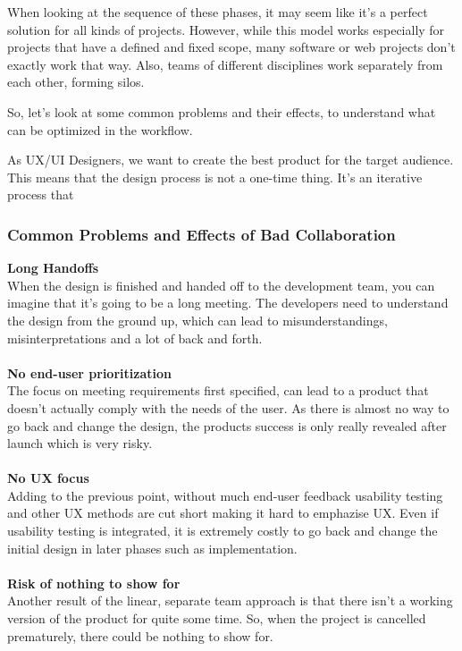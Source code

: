 When looking at the sequence of these phases, it may seem like it's a perfect solution for all kinds
of projects. However, while this model works especially for projects that have a defined and fixed
scope, many software or web projects don't exactly work that way. Also, teams of different
disciplines work separately from each other, forming silos.

So, let's look at some common problems and their effects, to understand what can be optimized in the
workflow.

As UX/UI Designers, we want to create the best product for the target audience. This means that the
design process is not a one-time thing. It's an iterative process that 

\subsubsection{Common Problems and Effects of Bad Collaboration}
\textbf{Long Handoffs} \\
When the design is finished and handed off to the development team, you can imagine that it's going
to be a long meeting. The developers need to understand the design from the ground up, which can
lead to misunderstandings, misinterpretations and a lot of back and forth.\\\\
\textbf{No end-user prioritization} \\
The focus on meeting requirements first specified, can lead to a product that doesn't actually comply
with the needs of the user. As there is almost no way to go back and change the design, the products
success is only really revealed after launch which is very risky.\\\\
\textbf{No UX focus} \\
Adding to the previous point, without much end-user feedback usability testing and other UX methods are
cut short making it hard to emphazise UX. Even if usability testing is integrated, it is extremely
costly to go back and change the initial design in later phases such as implementation.\\\\
\textbf{Risk of nothing to show for} \\
Another result of the linear, separate team approach is that there isn't a working version of the
product for quite some time. So, when the project is cancelled prematurely, there could be nothing
to show for.\\
